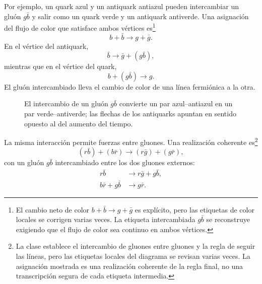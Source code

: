 Por ejemplo, un quark azul y un antiquark antiazul pueden intercambiar un gluón \(g\bar b\) y salir como un quark verde y un antiquark antiverde. Una asignación del flujo de color que satisface ambos vértices es\footnote{El cambio neto de color \(b+\bar b\longrightarrow g+\bar g\) es explícito, pero las etiquetas de color locales se corrigen varias veces. La etiqueta intercambiada \(g\bar b\) se reconstruye exigiendo que el flujo de color sea continuo en ambos vértices.}
\begin{equation}
b+\bar b
\longrightarrow
g+\bar g.
\end{equation}
En el vértice del antiquark,
\begin{equation}
\bar b\longrightarrow\bar g+(g\bar b),
\end{equation}
mientras que en el vértice del quark,
\begin{equation}
b+(g\bar b)\longrightarrow g.
\end{equation}
El gluón intercambiado lleva el cambio de color de una línea fermiónica a la otra.

\begin{figure}[h]
\centering
{}
\caption{El intercambio de un gluón \(g\bar b\) convierte un par azul--antiazul en un par verde--antiverde; las flechas de los antiquarks apuntan en sentido opuesto al del aumento del tiempo.}
\end{figure}

La misma interacción permite fuerzas entre gluones. Una realización coherente es\footnote{La clase establece el intercambio de gluones entre gluones y la regla de seguir las líneas, pero las etiquetas locales del diagrama se revisan varias veces. La asignación mostrada es una realización coherente de la regla final, no una transcripción segura de cada etiqueta intermedia.}
\begin{equation}
(r\bar b)+(b\bar r)
\longrightarrow
(r\bar g)+(g\bar r),
\end{equation}
con un gluón \(g\bar b\) intercambiado entre los dos gluones externos:
\begin{align}
r\bar b&\longrightarrow r\bar g+g\bar b,\\
b\bar r+g\bar b&\longrightarrow g\bar r.
\end{align}

